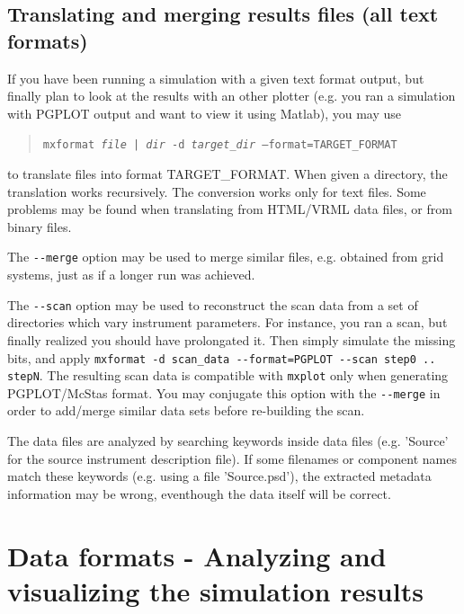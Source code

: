 \subsection{Translating and merging \MCX results files (all text formats)}
\label{s:mxformat}
    

If you have been running a \MCX simulation with a given text format output, but finally plan to look at the results with an other plotter (e.g. you ran a simulation with PGPLOT output and want to view it using Matlab), you may use
\begin{quote}
  \texttt{mxformat \textit{file | dir} -d \textit{target\_dir} --format=TARGET\_FORMAT}
\end{quote}
to translate files into format TARGET\_FORMAT. When given a directory, the translation works recursively. The conversion works only for text files. Some problems may be found when translating from HTML/VRML data files, or from binary files.

The \verb+--merge+ option may be used to merge similar files, e.g. obtained from grid systems, just as if a longer run was achieved.

The \verb+--scan+ option may be used to reconstruct the scan data from a set of directories which vary instrument parameters. For instance, you ran a scan, but finally realized you should have prolongated it. Then simply simulate the missing bits, and apply \verb+mxformat -d scan_data --format=PGPLOT --scan step0 .. stepN+. The resulting scan data is compatible with \verb+mxplot+ only when generating PGPLOT/McStas format. You may conjugate this option with the \verb+--merge+ in order to add/merge similar data sets before re-building the scan.

The data files are analyzed by searching keywords inside data files (e.g. 'Source' for the source instrument description file). If some filenames or component names match these keywords (e.g. using a file 'Source.psd'), the extracted metadata information may be wrong, eventhough the data itself will be correct.

\section{Data formats - Analyzing and visualizing the simulation results}
\label{s:analyze}

